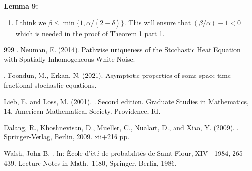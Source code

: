\documentclass[a4paper,11pt]{article}
\numberwithin{equation}{section}
\numberwithin{equation}{section}
\theoremstyle{plain}
\theoremstyle{definition}
\begin{document}
\textbf{Lemma 9:}
\begin{enumerate}
	\item I think we $\beta \le \min\{1, \alpha/(2-\bar{\delta})\}$. This will ensure that $(\beta/\alpha) -1 <0$ which is needed in the proof of Theorem 1 part 1. 
\end{enumerate}



\begin{thebibliography}{999}
	.
	Neuman, E. (2014).
	\newblock Pathwise uniqueness of the Stochastic Heat Equation with Spatially Inhomogeneous White Noise. 

	.
	Foondun, M., Erkan, N.  (2021).
	\newblock Asymptotic properties of some space-time
	fractional stochastic equations. 
	
	Lieb, E. and Loss, M. (2001).
	. Second edition.
	\newblock Graduate Studies in Mathematics, 14.
	\newblock American Mathematical Society, Providence, RI.
	
	Dalang, R., Khoshnevisan, D., Mueller, C., Nualart, D., and Xiao, Y. (2009).
	.
	\newblock Springer-Verlag, Berlin, 2009. xii+216 pp.
	
	Walsh, John B.
	.
	\newblock In: \`Ecole d'\`et\'e de probabilit\'es de
	Saint-Flour, XIV---1984, 265--439.
	Lecture Notes in Math.\ 1180, Springer, Berlin, 1986.

\end{thebibliography}
\end{document}
